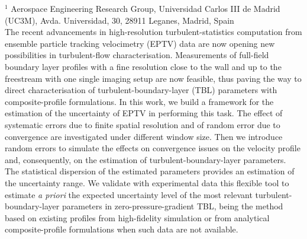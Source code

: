 %
%
%
%
%
%
%
\paperaffiliation
{%
  $^1$ Aerospace Engineering Research Group, Universidad Carlos III de Madrid (UC3M), Avda. Universidad, 30, 28911 Leganes, Madrid, Spain\\
}%
%
%
%
%
%
%
%
%
%
%
%
%
\papersummary%
{%
    The recent advancements in high-resolution turbulent-statistics computation from ensemble particle tracking velocimetry (EPTV) data are now opening new possibilities in turbulent-flow characterisation. Measurements of full-field boundary layer profiles with a fine resolution close to the wall and up to the freestream with one single imaging setup are now feasible, thus paving {the way} to direct characterisation of turbulent-boundary-layer (TBL) parameters with composite-profile formulations. In this work, we build a framework for the estimation of the uncertainty of EPTV in performing this task. The effect of systematic errors due to finite spatial resolution and of random error due to convergence are investigated under different window size. {Then we introduce random errors to simulate the effects on convergence issues on the velocity profile and, consequently, on the estimation of turbulent-boundary-layer parameters. The statistical dispersion of the estimated parameters provides an estimation of the uncertainty range.} We validate with experimental data {this} flexible tool to estimate \textit{a priori} the expected uncertainty level of the most relevant {turbulent-boundary-layer} parameters in zero-pressure-gradient TBL, being the method based on existing profiles from high-fidelity simulation or from analytical {composite-profile} formulations when such data are not available.
}%
